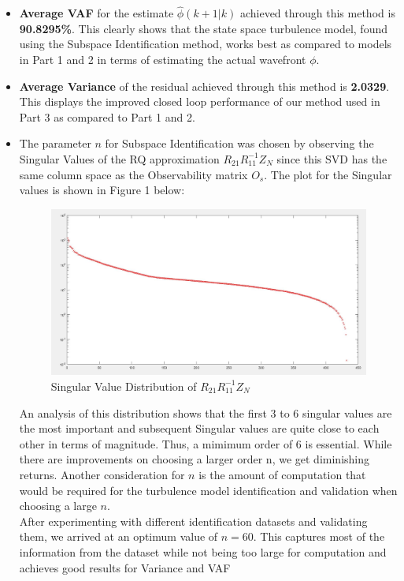 \documentclass[12pt]{report}
\begin{document}
\begin{itemize}
	\item \textbf{Average VAF} for the estimate $\hat{\phi}(k+1|k)$ achieved through this method is \textbf{90.8295\%}. This clearly shows that the state space turbulence model, found using the Subspace Identification method, works best as compared to models in Part 1 and 2 in terms of estimating the actual wavefront $\phi$.
	\item \textbf{Average Variance} of the residual achieved through this method is \textbf{2.0329}. This displays the improved closed loop performance of our method used in Part 3 as compared to Part 1 and 2.
	\item The parameter $n$ for Subspace Identification was chosen by observing the Singular Values of the RQ approximation $R_{21} R_{11}^{-1} Z_N$ since this SVD has the same column space as the Observability matrix $O_s$. The plot for the Singular values is shown in Figure 1 below:\\
\begin{figure}[!t]
	\centering
	\includegraphics[width=0.9\linewidth]{SubIDSVD.JPG}
	\caption{Singular Value Distribution of $R_{21} R_{11}^{-1} Z_N$}
	\label{fig:SVD SubID}
\end{figure}
	An analysis of this distribution shows that the first 3 to 6 singular values are the most important and subsequent Singular values are quite close to each other in terms of magnitude. Thus, a mimimum order of 6 is essential. While there are improvements on choosing a larger order n, we get diminishing returns. Another consideration for $n$ is the amount of computation that would be required for the turbulence model identification and validation when choosing a large $n$.\\
	After experimenting  with different identification datasets and validating them, we arrived at an optimum value of \textbf{$n = 60$}. This captures most of the information from the dataset while not being too large for computation and achieves good results for Variance and VAF

\end{itemize}
\end{document}
